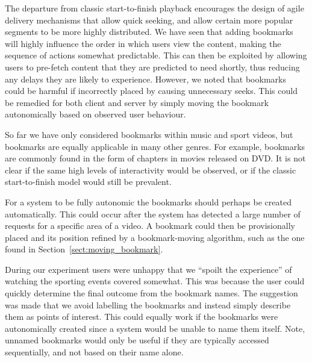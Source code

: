 \documentclass[a4paper,11pt]{article}
\begin{document}
The departure from classic start-to-finish playback encourages the design of agile delivery mechanisms that allow quick seeking, and allow certain more popular segments to be more highly distributed. We have seen that adding bookmarks will highly influence the order in which users view the content, making the sequence of actions somewhat predictable. This can then be exploited by allowing users to pre-fetch content that they are predicted to need shortly, thus reducing any delays they are likely to experience. However, we noted that bookmarks could be harmful if incorrectly placed by causing unnecessary seeks. This could be remedied for both client and server by simply moving the bookmark autonomically based on observed user behaviour.

%
%
%

So far we have only considered bookmarks within music and sport videos, but bookmarks are equally applicable in many other genres. For example, bookmarks are commonly found in the form of chapters in movies released on DVD. It is not clear if the same high levels of interactivity would be observed, or if the classic start-to-finish model would still be prevalent.

For a system to be fully autonomic the bookmarks should perhaps be created automatically. This could occur after the system has detected a large number of requests for a specific area of a video. A bookmark could then be provisionally placed and its position refined by a bookmark-moving algorithm, such as the one found in Section~\ref{sect:moving_bookmark}.

During our experiment users were unhappy that we ``spoilt the experience'' of watching the sporting events covered somewhat. This was because the user could quickly determine the final outcome from the bookmark names. The suggestion was made that we avoid labelling the bookmarks and instead simply describe them as points of interest. This could equally work if the bookmarks were autonomically created since a system would be unable to name them itself. Note, unnamed bookmarks would only be useful if they are typically accessed sequentially, and not based on their name alone.
\end{document}
